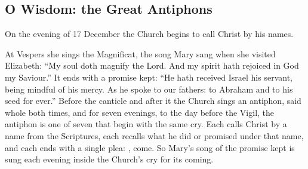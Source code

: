 \subsection{O Wisdom: the Great Antiphons}\label{sec:o-antiphons}

On the evening of 17 December the Church begins to call Christ by his names.

At Vespers she sings the Magnificat, the song Mary sang when she visited
Elizabeth: ``My soul doth magnify the Lord. And my spirit hath rejoiced in God
my Saviour.'' It ends with a promise kept: ``He hath received Israel his
servant, being mindful of his mercy. As he spoke to our fathers: to Abraham and
to his seed for ever.'' Before the canticle and after it the Church sings an
antiphon, said whole both times, and for seven evenings, to the day before the
Vigil, the antiphon is one of seven that begin with the same cry. Each calls
Christ by a name from the Scriptures, each recalls what he did or promised
under that name, and each ends with a single plea: , come. So
Mary's song of the promise kept is sung each evening inside the Church's cry
for its coming.

